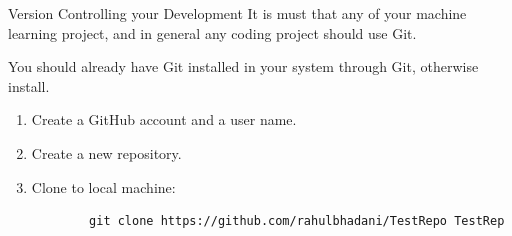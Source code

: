 \documentclass[aspectratio=169,xcolor=dvipsnames,svgnames,x11names,fleqn]{beamer}
\begin{document}
\begin{frame}
    \sectionpage
\end{frame}

\begin{frame}[containsverbatim]{Version Controlling your Development}
    It is must that any of your machine learning project, and in general any coding project should use Git.

    You should already have Git installed in your system through Git, otherwise install.

    \begin{enumerate}
        \item Create a GitHub account and a user name.
        \item Create a new repository.
        \item Clone to local machine:
        
        \begin{verbatim}
        git clone https://github.com/rahulbhadani/TestRepo TestRep
        \end{verbatim}

    \end{enumerate}
\end{frame}
\end{document}
